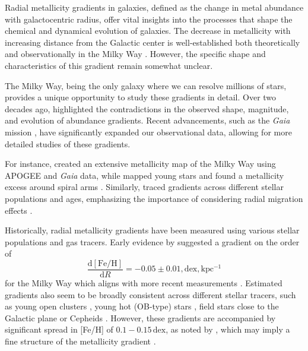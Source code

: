\documentclass[fleqn,usenatbib]{mnras}
\begin{document}
Radial metallicity gradients in galaxies, defined as the change in metal abundance with galactocentric radius, offer vital insights into the processes that shape the chemical and dynamical evolution of galaxies. The decrease in metallicity with increasing distance from the Galactic center is well-established both theoretically \citep{Larson1976, Tinsley1980, Chiosi1980} and observationally in the Milky Way \citep{Searle1971, Janes1979, Twarog1997}. However, the specific shape and characteristics of this gradient remain somewhat unclear.

The Milky Way, being the only galaxy where we can resolve millions of stars, provides a unique opportunity to study these gradients in detail. Over two decades ago, \citet{Chiappini2002} highlighted the contradictions in the observed shape, magnitude, and evolution of abundance gradients. Recent advancements, such as the \textit{Gaia} mission \citep{Gaia-Collaboration2016}, have significantly expanded our observational data, allowing for more detailed studies of these gradients.

For instance, \citet{Hogg2019} created an extensive metallicity map of the Milky Way using APOGEE and \textit{Gaia} data, while \citet{Poggio2022} mapped young stars and found a metallicity excess around spiral arms \citep[see also][]{Zari2018, Zari2021, Poggio2021, Hackshaw2024}. Similarly, \citet[][among others]{Imig2023} traced gradients across different stellar populations and ages, emphasizing the importance of considering radial migration effects \citep{Binney2008, Frankel2018, Frankel2020}.

Historically, radial metallicity gradients have been measured using various stellar populations and gas tracers. Early evidence by \citet{Janes1979} suggested a gradient on the order of
\begin{equation}
\frac{\mathrm{d{[Fe/H]}}}{\mathrm{d}R} = -0.05 \pm 0.01,\mathrm{dex,kpc^{-1}}
\end{equation}
for the Milky Way which aligns with more recent measurements \citep{Anders2017, Hayden2015}. Estimated gradients also seem to be broadly consistent across different stellar tracers, such as young open clusters \citep[e.g.][]{Yong2012, Cunha2016, Magrini2017, Casamiquela2019, Donor2020, Spina2021,Myers2022}, young hot (OB-type) stars \citep{Zari2018, Zari2021, Poggio2021, Poggio2022}, field stars close to the Galactic plane \citep[e.g.][]{Bergemann2014} or Cepheids \citep{Andrievsky2002, Andrievsky2002b, Lemasle2007, Lemasle2013}. However, these gradients are accompanied by significant spread in [Fe/H] of $0.1-0.15\,\mathrm{dex}$, as noted by \citet{Twarog1980}, which may imply a fine structure of the metallicity gradient \citep[see][]{Genovali2014}.
\end{document}
